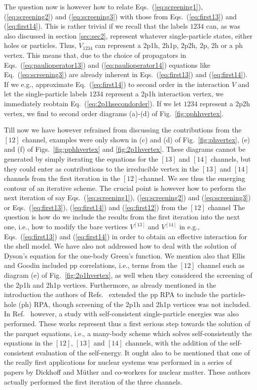 \documentclass{article}
\begin{document}
The question now is however how to relate
Eqs.\ (\ref{eq:screening1}),
(\ref{eq:screening2}) and (\ref{eq:screening3}) with those
from Eqs.\ (\ref{eq:first13}) and
(\ref{eq:first14}).
This is rather trivial if we recall that the labels
$1234$ can, as was also discussed in section \ref{sec:sec2},
represent whatever single-particle states, either holes
or particles. Thus, $V_{1234}$ can represent
a 2p1h, 2h1p, 2p2h, 2p, 2h or a ph vertex.
This means that, due to the choice of propagators
in Eqs.\ (\ref{eq:paulioperator13}) and
(\ref{eq:paulioperator14}) equations like Eq.\
(\ref{eq:screening3}) are already inherent in Eqs.\
(\ref{eq:first13}) and
(\ref{eq:first14}). If we e.g., approximate Eq.\ (\ref{eq:first14})
to second order in the interaction $V$ and let the
single-particle labels $1234$ represent a 2p1h interaction
vertex, we immediately reobtain Eq.\
(\ref{eq:2p1hsecondorder}). If we let $1234$ represent
a 2p2h vertex, we find to second order diagrams
(a)-(d) of Fig.\ \ref{fig:pphhvertex}.


Till now we have however refrained from discussing the contributions
from the $[12]$ channel, examples were only shown in (c) and (d) of
Fig.\ \ref{fig:phvertex}, (e) and (f) of Figs.\ \ref{fig:pphhvertex}
and \ref{fig:2p1hvertex}.
These diagrams cannot be generated by simply iterating
the equations for the $[13]$ and $[14]$ channels, but they could enter
as contributions to the irreducible vertex
in the $[13]$ and $[14]$ channels from the first iteration
in the $[12]$-channel.
We see thus the emerging contour of an iterative scheme.
The crucial point is however how to perform the next iteration of say
Eqs.\ (\ref{eq:screening1}),
(\ref{eq:screening2}) and (\ref{eq:screening3}) or
Eqs.\ (\ref{eq:first13}),
(\ref{eq:first14})  and (\ref{eq:first12}) from the
$[12]$ channel
The question is how do we include the results
from the first iteration into the next one, i.e.,
how to modify the bare vertices $V^{[13]}$ and $V^{[14]}$
in e.g., Eqs.\ (\ref{eq:first13}) and
(\ref{eq:first14}) in order to obtain
an effective interaction for the shell model.
We have also not addressed how to deal
with the solution of Dyson's equation for the one-body
Green's function.
We mention also that Ellis and Goodin \cite{eg80}
included pp correlations, i.e., terms from the $[12]$ channel
such as diagram (e) of Fig.\ \ref{fig:2p1hvertex},
as well when they considered the screening of the 2p1h and 2h1p vertices.
Furthermore, as already mentioned in the introduction
the authors of Refs.\ \cite{emm91,hmm95}
extended the pp RPA to include the particle-hole (ph) RPA, though
screening of the 2p1h and 2h1p vertices was not included. In Ref.\
\cite{hmm95} however, a study with
self-consistent  single-particle energies was also performed.
These works represent thus a first serious step towards the solution
of the parquet equations, i.e., a many-body scheme which solves
self-consistently the equations in the $[12]$, $[13]$ and $[14]$
channels, with the addition of the self-consistent evaluation
of the self-energy. It ought also to be mentioned
that one of the really
first applications for nuclear systems was performed
in a series of papers by Dickhoff and M\"uther and co-workers
\cite{nuclearmatter}  for nuclear matter. These authors
actually performed the first iteration of the three
channels.
\end{document}
